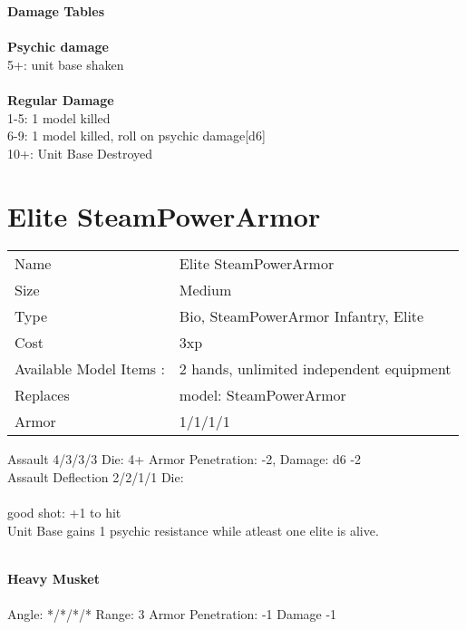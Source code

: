 {\bf Damage Tables} \\
\ \\ {\bf Psychic damage } \\
5+: unit base shaken \\
\ \\ {\bf Regular Damage } \\
1-5: 1 model killed \\
6-9: 1 model killed, roll on psychic damage[d6] \\
10+: Unit Base Destroyed \\









\pagebreak

\section{ Elite SteamPowerArmor }

\begin{tabular}{ll}
  Name & Elite SteamPowerArmor \\
  Size & Medium\\
  Type & Bio, SteamPowerArmor Infantry, Elite\\
  Cost & 3xp\\
  Available Model Items : &2 hands, unlimited independent equipment\\
  Replaces & model: SteamPowerArmor\\
  Armor & 1/1/1/1
\end{tabular}



Assault 4/3/3/3 Die: 4+ Armor Penetration: -2, Damage: d6 -2 \\
Assault Deflection 2/2/1/1 Die: \\

\ \\

good shot: +1 to hit \\ Unit Base gains 1 psychic resistance while atleast one elite is alive.

\ \\
{\bf Heavy Musket } \\
\ \\
Angle: */*/*/* Range: 3 Armor Penetration: -1 Damage -1 \\
\indent  \\





